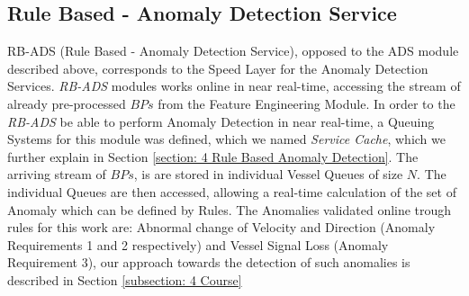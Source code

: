 \subsection{Rule Based - Anomaly Detection Service}
\label{subsection: 3 RB-ADS}
RB-ADS (Rule Based - Anomaly Detection Service), opposed to the ADS module described above, corresponds to the Speed Layer for the Anomaly Detection Services. \emph{RB-ADS} modules works online in near real-time, accessing the stream of already pre-processed $BPs$ from the Feature Engineering Module. In order to the \emph{RB-ADS} be able to perform Anomaly Detection in near real-time, a Queuing Systems for this module was defined, which we named \emph{Service Cache}, which we further explain in Section \ref{section: 4 Rule Based Anomaly Detection}. The arriving stream of $BPs$, is are stored in individual Vessel Queues of size $N$. The individual Queues are then accessed, allowing a real-time calculation of the set of Anomaly which can be defined by Rules. The Anomalies validated online trough rules for this work are: Abnormal change of Velocity and Direction (Anomaly Requirements 1 and 2 respectively) and Vessel Signal Loss (Anomaly Requirement 3), our approach towards the detection of such anomalies is described in Section \ref{subsection: 4 Course}  






